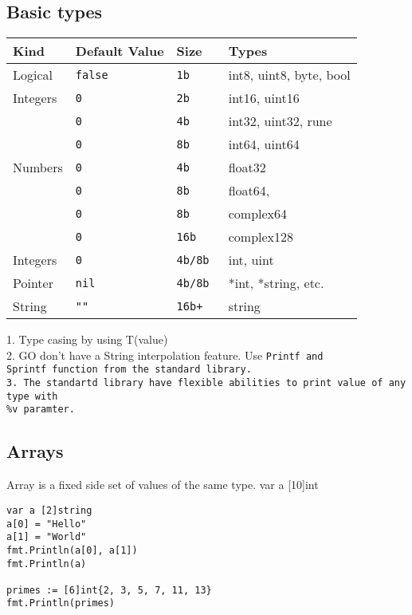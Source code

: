 \documentclass[12pt]{article}
\begin{document}
\subsection{Basic types}
\begin{paracol}{2}
\begin{leftcolumn}
\begin{tabular}{llll}
\hline
Kind        & Default Value & Size    & Types       \\
\hline
Logical     & \tt{false}& \tt{1b}      & int8, uint8, byte, bool \\
Integers    & \tt{0}    & \tt{2b}      & int16, uint16 \\
            & \tt{0}    & \tt{4b}      & int32, uint32, rune\\
            & \tt{0}    & \tt{8b}      & int64, uint64\\
Numbers     & \tt{0}    & \tt{4b}      & float32 \\
            & \tt{0}    & \tt{8b}      & float64,  \\
            & \tt{0}    & \tt{8b}      & complex64  \\
            & \tt{0}    & \tt{16b}     & complex128 \\
Integers    & \tt{0}    & \tt{4b/8b}   & int, uint \\
Pointer     & \tt{nil}  & \tt{4b/8b}   & *int, *string, etc. \\
String      & \tt{""}   & \tt{16b+}    & string \\
\hline
\end{tabular}
\end{leftcolumn}
\begin{rightcolumn}
1. Type casing by using T(value) \\
2. GO don't have a String interpolation feature. Use \tt{Printf} and \\
\tt{Sprintf} function from the standard library. \\
3. The standartd library have flexible abilities to print value of any type with \\
\%v paramter.
\end{rightcolumn}
\end{paracol}

\subsection{Arrays}
Array is a fixed side set of values of the same type.
var a [10]int
\begin{lstlisting}
var a [2]string
a[0] = "Hello"
a[1] = "World"
fmt.Println(a[0], a[1])
fmt.Println(a)

primes := [6]int{2, 3, 5, 7, 11, 13}
fmt.Println(primes)
\end{lstlisting}
\end{document}
